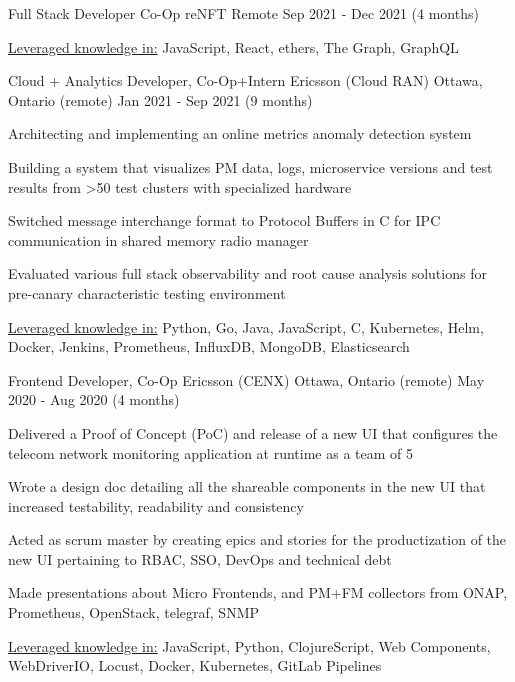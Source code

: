 \begin{cventries}
	\cventry
	{Full Stack Developer Co-Op}
	{reNFT}
	{Remote}
	{Sep 2021 - Dec 2021 (4 months)}
	{
		\begin{cvitems}
			\item{\underline{Leveraged knowledge in:} JavaScript, React, ethers, The Graph, GraphQL}
		\end{cvitems}
	}
	\cventry
	{Cloud + Analytics Developer, Co-Op+Intern}
	{Ericsson (Cloud RAN)}
	{Ottawa, Ontario (remote)}
	{Jan 2021 - Sep 2021 (9 months)}
	{
		\begin{cvitems}
			\item{Architecting and implementing an online metrics anomaly detection system}
			\item{Building a system that visualizes PM data, logs, microservice versions and test results from >50 test clusters with specialized hardware}
			\item{Switched message interchange format to Protocol Buffers in C for IPC communication in shared memory radio manager}
			\item{Evaluated various full stack observability and root cause analysis solutions for pre-canary characteristic testing environment}
			\item{\underline{Leveraged knowledge in:} Python, Go, Java, JavaScript, C, Kubernetes, Helm, Docker, Jenkins, Prometheus, InfluxDB, MongoDB, Elasticsearch}
		\end{cvitems}
	}
	\cventry
	{Frontend Developer, Co-Op}
	{Ericsson (CENX)}
	{Ottawa, Ontario (remote)}
	{May 2020 - Aug 2020 (4 months)}
	{
		\begin{cvitems}
			\item{Delivered a Proof of Concept (PoC) and release of a new UI that configures the telecom network monitoring application at runtime as a team of 5}
			\item{Wrote a design doc detailing all the shareable components in the new UI that increased testability, readability and consistency}
			\item{Acted as scrum master by creating epics and stories for the productization of the new UI pertaining to RBAC, SSO, DevOps and technical debt}
			\item{Made presentations about Micro Frontends, and PM+FM collectors from ONAP, Prometheus, OpenStack, telegraf, SNMP}
			\item{\underline{Leveraged knowledge in:} JavaScript, Python, ClojureScript, Web Components, WebDriverIO, Locust, Docker, Kubernetes, GitLab Pipelines}

\end{cvitems}}
\end{cventries}
